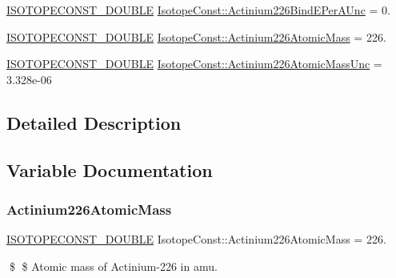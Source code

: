 \begin{DoxyCompactItemize}
\mbox{\hyperlink{group___isotope_const-_macros_ga8f45a7272ce02c0b4c65c44636ed719a}{I\+S\+O\+T\+O\+P\+E\+C\+O\+N\+S\+T\+\_\+\+D\+O\+U\+B\+LE}} \mbox{\hyperlink{group___isotope_const-_actinium-_ac226_gaa2b5ad8b5312561895a8f68837d8d03e}{Isotope\+Const\+::\+Actinium226\+Bind\+E\+Per\+A\+Unc}} = 0.
\item 
\mbox{\hyperlink{group___isotope_const-_macros_ga8f45a7272ce02c0b4c65c44636ed719a}{I\+S\+O\+T\+O\+P\+E\+C\+O\+N\+S\+T\+\_\+\+D\+O\+U\+B\+LE}} \mbox{\hyperlink{group___isotope_const-_actinium-_ac226_ga58dee81c6cdc838fa921bbf0d883eee6}{Isotope\+Const\+::\+Actinium226\+Atomic\+Mass}} = 226.
\item 
\mbox{\hyperlink{group___isotope_const-_macros_ga8f45a7272ce02c0b4c65c44636ed719a}{I\+S\+O\+T\+O\+P\+E\+C\+O\+N\+S\+T\+\_\+\+D\+O\+U\+B\+LE}} \mbox{\hyperlink{group___isotope_const-_actinium-_ac226_ga333c12779a2e0b17d8bfe65d01f6b714}{Isotope\+Const\+::\+Actinium226\+Atomic\+Mass\+Unc}} = 3.\+328e-\/06
\end{DoxyCompactItemize}


\subsection{Detailed Description}


\subsection{Variable Documentation}
\mbox{\label{group___isotope_const-_actinium-_ac226_ga58dee81c6cdc838fa921bbf0d883eee6}} 
\subsubsection{\texorpdfstring{Actinium226\+Atomic\+Mass}{Actinium226AtomicMass}}
{\footnotesize\ttfamily \mbox{\hyperlink{group___isotope_const-_macros_ga8f45a7272ce02c0b4c65c44636ed719a}{I\+S\+O\+T\+O\+P\+E\+C\+O\+N\+S\+T\+\_\+\+D\+O\+U\+B\+LE}} Isotope\+Const\+::\+Actinium226\+Atomic\+Mass = 226.}

\$ \$ Atomic mass of Actinium-\/226 in amu. \mbox{\label{group___isotope_const-_actinium-_ac226_ga333c12779a2e0b17d8bfe65d01f6b714}} 
